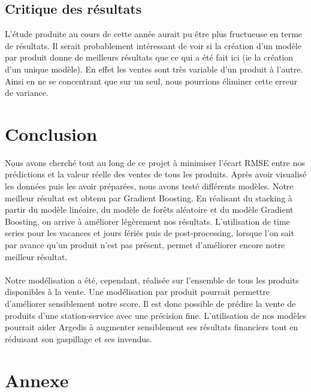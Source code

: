 \documentclass{article} %
\begin{document}
\subsection{Critique des résultats}
L'étude produite au cours de cette année aurait pu être plus fructueuse en terme de résultats. Il serait probablement intéressant de voir si la création d'un modèle par produit donne de meilleurs résultats que ce qui a été fait ici (ie la création d'un unique modèle). En effet les ventes sont très variable d'un produit à l'autre. Ainsi en ne se concentrant que sur un seul, nous pourrions éliminer cette erreur de variance.

\section{Conclusion}
Nous avons cherché tout au long de ce projet à minimiser l’écart RMSE entre nos prédictions et la valeur réelle des ventes de tous les produits. Après avoir visualisé les données puis les avoir préparées, nous avons testé différents modèles. Notre meilleur résultat est obtenu par Gradient Boosting. En réalisant du stacking à partir du modèle linéaire, du modèle de forêts aléatoire et du modèle Gradient Boosting, on arrive à améliorer légèrement nos résultats. L’utilisation de time series pour les vacances et jours fériés puis de post-processing, lorsque l’on sait par avance qu’un produit n’est pas présent, permet d’améliorer encore notre meilleur résultat.\\\\

Notre modélisation a été, cependant, réalisée sur l’ensemble de tous les produits disponibles à la vente. Une modélisation par produit pourrait permettre d’améliorer sensiblement notre score.
Il est donc possible de prédire la vente de produits d’une station-service avec une précision fine. L’utilisation de nos modèles pourrait aider Argedis à augmenter sensiblement ses résultats financiers tout en réduisant son gaspillage et ses invendus.

\newpage
\section{Annexe}
\end{document}
